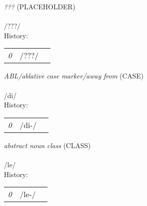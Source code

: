 \vspace{15pt}
\begin{nopagebreak}
 \textit{???} (PLACEHOLDER)\\
\\
\noindent /???/\\


\noindent History:

\vspace{-0pt}
\hspace{40pt}
\begin{tabular}{ccc}
\textit{0} & /???/& \\
\end{tabular}

\vspace{20pt}\hline

\end{nopagebreak}
\filbreak



\vspace{15pt}
\begin{nopagebreak}
 \textit{ABL/ablative case marker/away from} (CASE)\\
\\
\noindent /d{\textprimstress}i/\\


\noindent History:

\vspace{-0pt}
\hspace{40pt}
\begin{tabular}{ccc}
\textit{0} & /di-/& \\
\end{tabular}

\vspace{20pt}\hline

\end{nopagebreak}
\filbreak



\vspace{15pt}
\begin{nopagebreak}
 \textit{abstract noun class} (CLASS)\\
\\
\noindent /l{\textprimstress}e/\\


\noindent History:

\vspace{-0pt}
\hspace{40pt}
\begin{tabular}{ccc}
\textit{0} & /le-/& \\
\end{tabular}

\vspace{20pt}\hline

\end{nopagebreak}
\filbreak



